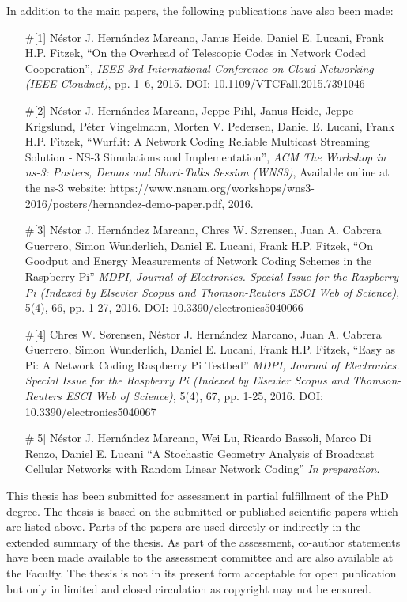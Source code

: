 \noindent In addition to the main papers, the following publications have also been made:
\begin{itemize}

  \item[\#{[1]}] N\'estor J. Hern\'andez Marcano, Janus Heide, Daniel E. Lucani, Frank H.P. Fitzek, ``On the Overhead of Telescopic Codes in Network Coded Cooperation'', \emph{IEEE 3rd International Conference on Cloud Networking (IEEE Cloudnet)}, pp. 1--6, 2015. DOI: 10.1109/VTCFall.2015.7391046

  \item[\#{[2]}] N\'estor J. Hern\'andez Marcano, Jeppe Pihl, Janus Heide, Jeppe Krigslund, P\'eter Vingelmann, Morten V. Pedersen, Daniel E. Lucani, Frank H.P. Fitzek, ``Wurf.it: A Network Coding Reliable Multicast Streaming Solution - NS-3 Simulations and Implementation'', \emph{ACM The Workshop in ns-3: Posters, Demos and Short-Talks Session (WNS3)}, Available online at the ns-3 website: https://www.nsnam.org/workshops/wns3-2016/posters/hernandez-demo-paper.pdf, 2016.

  \item[\#{[3]}] N\'estor J. Hern\'andez Marcano, Chres W. S\o rensen, Juan A. Cabrera Guerrero, Simon Wunderlich, Daniel E. Lucani, Frank H.P. Fitzek, ``On Goodput and Energy Measurements of Network Coding Schemes in the Raspberry Pi'' \emph{MDPI, Journal of Electronics. Special Issue for the Raspberry Pi (Indexed by Elsevier Scopus and Thomson-Reuters ESCI Web of Science)}, 5(4), 66, pp. 1-27, 2016. DOI: 10.3390/electronics5040066

  \item[\#{[4]}] Chres W. S\o rensen, N\'estor J. Hern\'andez Marcano, Juan A. Cabrera Guerrero, Simon Wunderlich, Daniel E. Lucani, Frank H.P. Fitzek, ``Easy as Pi: A Network Coding Raspberry Pi Testbed'' \emph{MDPI, Journal of Electronics. Special Issue for the Raspberry Pi (Indexed by Elsevier Scopus and Thomson-Reuters ESCI Web of Science)}, 5(4), 67, pp. 1-25, 2016. DOI: 10.3390/electronics5040067

  \item[\#{[5]}] N\'estor J. Hern\'andez Marcano, Wei Lu, Ricardo Bassoli, Marco Di Renzo, Daniel E. Lucani ``A Stochastic Geometry Analysis of Broadcast Cellular Networks with Random Linear Network Coding'' \emph{In preparation}.

\end{itemize}

\noindent This thesis has been submitted for assessment in partial fulfillment of the PhD degree. The thesis is based on the submitted or published scientific papers which are listed above. Parts of the papers are used directly or indirectly in the extended summary of the thesis. As part of the assessment, co-author statements have been made available to the assessment committee and are also available at the Faculty. The thesis is not in its present form acceptable for open publication but only in limited and closed circulation as copyright may not be ensured.